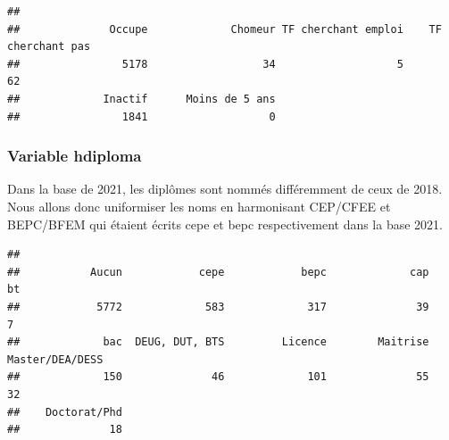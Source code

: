 \documentclass[
]{article}
\newenvironment{Shaded}{\begin{snugshade}}{\end{snugshade}}
\newcommand{\CommentTok}[1]{\textcolor[rgb]{0.56,0.35,0.01}{\textit{#1}}}
\newcommand{\FunctionTok}[1]{\textcolor[rgb]{0.13,0.29,0.53}{\textbf{#1}}}
\newcommand{\NormalTok}[1]{#1}
\newcommand{\OtherTok}[1]{\textcolor[rgb]{0.56,0.35,0.01}{#1}}
\newcommand{\SpecialCharTok}[1]{\textcolor[rgb]{0.81,0.36,0.00}{\textbf{#1}}}
\begin{document}
\begin{Shaded}
\end{Shaded}

\begin{verbatim}
## 
##              Occupe             Chomeur TF cherchant emploi    TF cherchant pas 
##                5178                  34                   5                  62 
##             Inactif      Moins de 5 ans 
##                1841                   0
\end{verbatim}

\hypertarget{variable-hdiploma}{%
\subsubsection{Variable hdiploma}\label{variable-hdiploma}}

Dans la base de 2021, les diplômes sont nommés différemment de ceux de
2018. Nous allons donc uniformiser les noms en harmonisant CEP/CFEE et
BEPC/BFEM qui étaient écrits cepe et bepc respectivement dans la base
2021.

\begin{Shaded}
\end{Shaded}

\begin{verbatim}
## 
##           Aucun            cepe            bepc             cap              bt 
##            5772             583             317              39               7 
##             bac  DEUG, DUT, BTS         Licence        Maitrise Master/DEA/DESS 
##             150              46             101              55              32 
##    Doctorat/Phd 
##              18
\end{verbatim}
\end{document}

